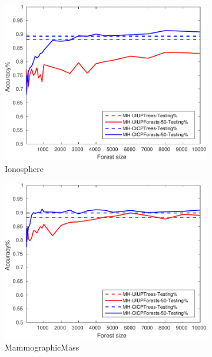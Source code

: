 \begin{figure}[ht]
\begin{subfigure}[b]{0.3\textwidth}
		\centering
  	\includegraphics[width=\textwidth]{figs/PLPTF/Forests/IonosphereDownsampledFurther_Forests_MH.pdf}
  	\caption{Ionosphere}
		\label{fig:I4}
	\end{subfigure}
  \begin{subfigure}[b]{0.3\textwidth}
		\centering
  	\includegraphics[width=\textwidth]{figs/PLPTF/Forests/MammographicMassDownsampled_Forests_MH.pdf}
  	\caption{MammographicMass}
		\label{fig:Mam4}
	\end{subfigure}
	\\
  \begin{subfigure}[b]{0.3\textwidth}
		\centering

\end{subfigure}
\end{figure}
